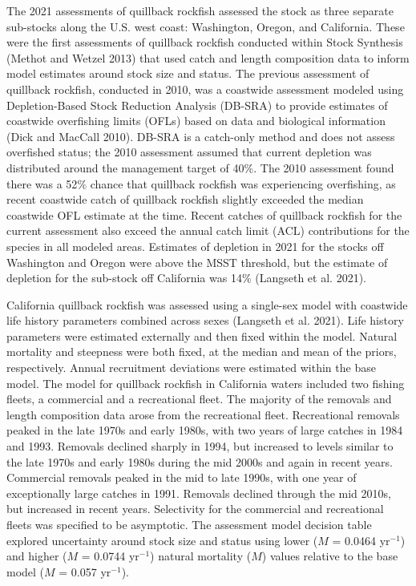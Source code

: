 \documentclass[11pt,
  letterpaper,
]{article}
\begin{document}
The 2021 assessments of quillback rockfish assessed the stock as three separate sub-stocks along the U.S. west coast: Washington, Oregon, and California. These were the first assessments of quillback rockfish conducted within Stock Synthesis (Methot and Wetzel 2013) that used catch and length composition data to inform model estimates around stock size and status. The previous assessment of quillback rockfish, conducted in 2010, was a coastwide assessment modeled using Depletion-Based Stock Reduction Analysis (DB-SRA) to provide estimates of coastwide overfishing limits (OFLs) based on data and biological information (Dick and MacCall 2010). DB-SRA is a catch-only method and does not assess overfished status; the 2010 assessment assumed that current depletion was distributed around the management target of 40\(\%\). The 2010 assessment found there was a 52\(\%\) chance that quillback rockfish was experiencing overfishing, as recent coastwide catch of quillback rockfish slightly exceeded the median coastwide OFL estimate at the time. Recent catches of quillback rockfish for the current assessment also exceed the annual catch limit (ACL) contributions for the species in all modeled areas. Estimates of depletion in 2021 for the stocks off Washington and Oregon were above the MSST threshold, but the estimate of depletion for the sub-stock off California was 14\(\%\) (Langseth et al. 2021).

California quillback rockfish was assessed using a single-sex model with coastwide life history parameters combined across sexes (Langseth et al. 2021). Life history parameters were estimated externally and then fixed within the model. Natural mortality and steepness were both fixed, at the median and mean of the priors, respectively. Annual recruitment deviations were estimated within the base model. The model for quillback rockfish in California waters included two fishing fleets, a commercial and a recreational fleet. The majority of the removals and length composition data arose from the recreational fleet. Recreational removals peaked in the late 1970s and early 1980s, with two years of large catches in 1984 and 1993. Removals declined sharply in 1994, but increased to levels similar to the late 1970s and early 1980s during the mid 2000s and again in recent years. Commercial removals peaked in the mid to late 1990s, with one year of exceptionally large catches in 1991. Removals declined through the mid 2010s, but increased in recent years. Selectivity for the commercial and recreational fleets was specified to be asymptotic. The assessment model decision table explored uncertainty around stock size and status using lower (\(M\) = 0.0464 yr\(^{-1}\)) and higher (\(M\) = 0.0744 yr\(^{-1}\)) natural mortality (\(M\)) values relative to the base model (\(M\) = 0.057 yr\(^{-1}\)).
\end{document}
